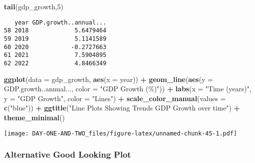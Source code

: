 \documentclass[
]{article}
\newenvironment{Shaded}{\begin{snugshade}}{\end{snugshade}}
\newcommand{\AttributeTok}[1]{\textcolor[rgb]{0.13,0.29,0.53}{#1}}
\newcommand{\DecValTok}[1]{\textcolor[rgb]{0.00,0.00,0.81}{#1}}
\newcommand{\FunctionTok}[1]{\textcolor[rgb]{0.13,0.29,0.53}{\textbf{#1}}}
\newcommand{\NormalTok}[1]{#1}
\newcommand{\SpecialCharTok}[1]{\textcolor[rgb]{0.81,0.36,0.00}{\textbf{#1}}}
\newcommand{\StringTok}[1]{\textcolor[rgb]{0.31,0.60,0.02}{#1}}
\begin{document}
\begin{Shaded}
\begin{Highlighting}[]
\FunctionTok{tail}\NormalTok{(gdp\_growth,}\DecValTok{5}\NormalTok{)}
\end{Highlighting}
\end{Shaded}

\begin{verbatim}
   year GDP.growth..annual...
58 2018             5.6479464
59 2019             5.1141589
60 2020            -0.2727663
61 2021             7.5904895
62 2022             4.8466349
\end{verbatim}

\begin{Shaded}
\begin{Highlighting}[]
\FunctionTok{ggplot}\NormalTok{(}\AttributeTok{data =}\NormalTok{ gdp\_growth, }\FunctionTok{aes}\NormalTok{(}\AttributeTok{x =}\NormalTok{ year)) }\SpecialCharTok{+}
  \FunctionTok{geom\_line}\NormalTok{(}\FunctionTok{aes}\NormalTok{(}\AttributeTok{y =}\NormalTok{ GDP.growth..annual..., }\AttributeTok{color =} \StringTok{"GDP Growth (\%)"}\NormalTok{)) }\SpecialCharTok{+}
  \FunctionTok{labs}\NormalTok{(}\AttributeTok{x =} \StringTok{"Time (years)"}\NormalTok{, }\AttributeTok{y =} \StringTok{"GDP Growth"}\NormalTok{, }\AttributeTok{color =} \StringTok{"Lines"}\NormalTok{) }\SpecialCharTok{+}
  \FunctionTok{scale\_color\_manual}\NormalTok{(}\AttributeTok{values =} \FunctionTok{c}\NormalTok{(}\StringTok{"blue"}\NormalTok{)) }\SpecialCharTok{+}
  \FunctionTok{ggtitle}\NormalTok{(}\StringTok{"Line Plots Showing Trends GDP Growth over time"}\NormalTok{) }\SpecialCharTok{+}
  \FunctionTok{theme\_minimal}\NormalTok{()}
\end{Highlighting}
\end{Shaded}

\texttt{[image: DAY-ONE-AND-TWO\_files/figure-latex/unnamed-chunk-45-1.pdf]}

\hypertarget{alternative-good-looking-plot}{%
\subsubsection{Alternative Good Looking
Plot}\label{alternative-good-looking-plot}}
\end{document}
